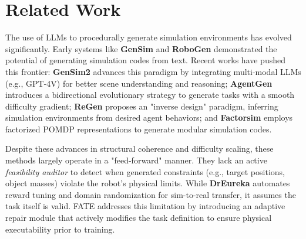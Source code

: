 \documentclass{article}
\theoremstyle{plain}
\theoremstyle{definition}
\theoremstyle{remark}
\begin{document}



\section{Related Work}
\label{sec:related_work}
The use of LLMs to procedurally generate simulation environments has evolved significantly. Early systems like \textbf{GenSim} \cite{wang2023gensim} and \textbf{RoboGen} \cite{wang2023robogen} demonstrated the potential of generating simulation codes from text. Recent works have pushed this frontier: \textbf{GenSim2} \cite{gensim2_2025} advances this paradigm by integrating multi-modal LLMs (e.g., GPT-4V) for better scene understanding and reasoning; \textbf{AgentGen} \cite{agentgen_2025} introduces a bidirectional evolutionary strategy to generate tasks with a smooth difficulty gradient; \textbf{ReGen} \cite{regen_2025} proposes an "inverse design" paradigm, inferring simulation environments from desired agent behaviors; and \textbf{Factorsim} \cite{factorsim_2024} employs factorized POMDP representations to generate modular simulation codes. 

Despite these advances in structural coherence and difficulty scaling, these methods largely operate in a "feed-forward" manner. They lack an active \textit{feasibility auditor} to detect when generated constraints (e.g., target positions, object masses) violate the robot's physical limits. While \textbf{DrEureka} \cite{ma2024dreureka} automates reward tuning and domain randomization for sim-to-real transfer, it assumes the task itself is valid. FATE addresses this limitation by introducing an adaptive repair module that actively modifies the task definition to ensure physical executability prior to training.
\end{document}

